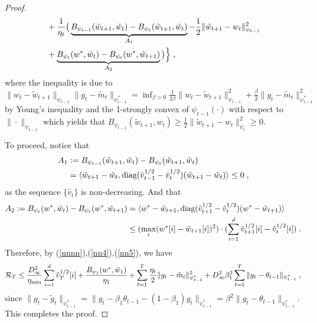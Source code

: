 \documentclass[wcp]{jmlr}
\begin{document}
\begin{proof}
\begin{equation}
\begin{aligned}
 &  + \frac{1}{\eta_t} \big(\underbrace{B_{\psi_{t-1}}(\tilde{w}_{t+1}, \tilde{w}_{t}) - B_{\psi_t}(\tilde{w}_{t+1}, \tilde{w}_{t}) }_{A_1}- \frac{1}{2} \| \tilde{w}_{t+1} - w_t \|_{\psi_{t-1}}^2\\
 &+\underbrace{B_{\psi_t}( w^*, \tilde{w}_{t}) -B_{\psi_t}(w^*,  \tilde{w}_{t+1} )}_{A_2}  \big) \Big\} \eqsp,
\end{aligned}
\end{equation}
where the inequality is due to $ \| w_t - \tilde{w}_{t+1}   \|_{\psi_{t-1}} \| g_t - \tilde{m}_t  \|_{\psi_{t-1}^*} = \inf_{ \beta > 0 }   \frac{1}{2\beta} \| w_t - \tilde{w}_{t+1} \|_{\psi_{t-1}}^2 +  \frac{\beta}{2} \| g_t - \tilde{m}_t  \|_{\psi_{t-1}^*}^2$ by Young's inequality and the 1-strongly convex of $\psi_{t-1}(\cdot)$ with respect to $\| \cdot \|_{\psi_{t-1}}$ which yields that $B_{\psi_{t-1}}(\tilde{w}_{t+1}, w_t )  \geq \frac{1}{2} \| \tilde{w}_{t+1} -  w_t  \|^2_{\psi_t} \geq 0$. 

To proceed, notice that
\begin{equation} \label{nn5}
\begin{aligned}
A_1& :=  B_{\psi_{t-1}}(\tilde{w}_{t+1}, \tilde{w}_{t}) - B_{\psi_t}(\tilde{w}_{t+1}, \tilde{w}_{t})  \\
& = \langle \tilde{w}_{t+1} - \tilde{w}_{t} , \text{diag}(\hat{v}_{t-1}^{1/2} -\hat{v}_t^{1/2} ) ( \tilde{w}_{t+1}- \tilde{w}_{t} ) \rangle \leq 0 \eqsp,
\end{aligned}
\end{equation}
as the sequence $\{\hat{v}_t\}$ is non-decreasing. And that
\begin{equation}  \label{nn4}
\begin{aligned}
A_2 := B_{\psi_t}( w^*, \tilde{w}_{t}) -B_{\psi_t}(w^*,  \tilde{w}_{t+1} )  &= \langle w^* - \tilde{w}_{t+1}  , \text{diag}(\hat{v}_{t+1}^{1/2} -\hat{v}_t^{1/2} ) ( w^* - \tilde{w}_{t+1}  ) \rangle\\
  & \leq ( \max_i (w^*[i] -  \tilde{w}_{t+1} [i] )^2  )\cdot ( \sum_{i=1}^d \hat{v}_{t+1}^{1/2}[i] -\hat{v}_t^{1/2}[i] ) \eqsp.
\end{aligned}
\end{equation}
Therefore, by (\ref{nnnn}),(\ref{nn4}),(\ref{nn5}), we have
\begin{equation}\notag
\begin{aligned}
\mathcal{R}_T \leq  \frac{D_{\infty}^2}{\eta_{\min}}  \sum_{i=1}^d \hat{v}_{T}^{1/2}[i] + \frac{ B_{\psi_1}(w^*, \tilde{w}_{1})}{\eta_1}
+ \sum_{t=1}^T\frac{\eta_t}{2} \| g_t - \tilde{m}_t  \|_{\psi_{t-1}^*}^2  +D_{\infty}^2 \beta_1^2  \sum_{t=1}^T \| g_t - \theta_{t-1}  \|_{\psi_{t-1}^*}  \eqsp,
\end{aligned}
\end{equation}
since $  \| g_t - \tilde{g}_t  \|_{\psi_{t-1}^*} =  \| g_t - \beta_1 \theta_{t-1} -(1- \beta_1) g_t \|_{\psi_{t-1}^*} = \beta^2 \| g_t - \theta_{t-1}  \|_{\psi_{t-1}^*} $.
This completes the proof.

\end{proof}
\end{document}
